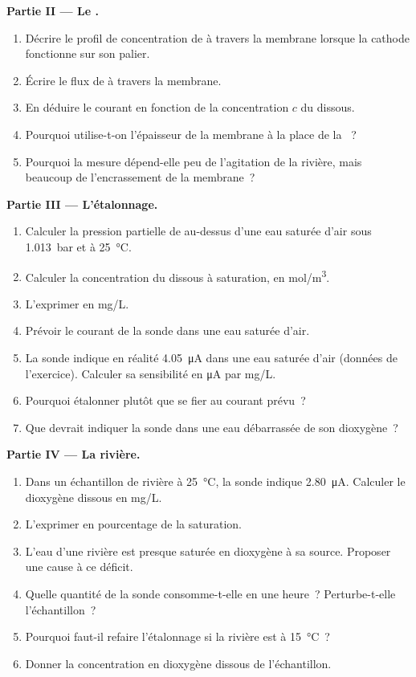 \begin{problem}
\medskip
\noindent\textbf{Partie II --- Le .}
\begin{enumerate}[resume]
  \item Décrire le profil de concentration de  à travers la membrane lorsque la
        cathode fonctionne sur son palier.
  \item Écrire le flux de  à travers la membrane.
  \item En déduire le courant en fonction de la concentration $c$ du 
        dissous.
  \item Pourquoi utilise-t-on l'épaisseur de la membrane à la place de la ~?
  \item Pourquoi la mesure dépend-elle peu de l'agitation de la rivière, mais
        beaucoup de l'encrassement de la membrane~?
\end{enumerate}

\medskip
\noindent\textbf{Partie III --- L'étalonnage.}
\begin{enumerate}[resume]
  \item Calculer la pression partielle de  au-dessus d'une eau saturée d'air sous
        \qty{1.013}{bar} et à \qty{25}{\degreeCelsius}.
  \item Calculer la concentration du  dissous à saturation, en
        \unit{mol/m^3}.
  \item L'exprimer en \unit{mg/L}.
  \item Prévoir le courant de la sonde dans une eau saturée d'air.
  \item La sonde indique en réalité \qty{4.05}{\micro A} dans une eau saturée d'air
        (données de l'exercice). Calculer sa sensibilité en \unit{\micro A} par
        \unit{mg/L}.
  \item Pourquoi étalonner plutôt que se fier au courant prévu~?
  \item Que devrait indiquer la sonde dans une eau débarrassée de son dioxygène~?
\end{enumerate}

\medskip
\noindent\textbf{Partie IV --- La rivière.}
\begin{enumerate}[resume]
  \item Dans un échantillon de rivière à \qty{25}{\degreeCelsius}, la sonde indique
        \qty{2.80}{\micro A}. Calculer le dioxygène dissous en \unit{mg/L}.
  \item L'exprimer en pourcentage de la saturation.
  \item L'eau d'une rivière est presque saturée en dioxygène à sa source.
        Proposer une cause à ce déficit.
  \item Quelle quantité de  la sonde consomme-t-elle en une heure~? Perturbe-t-elle
        l'échantillon~?
  \item Pourquoi faut-il refaire l'étalonnage si la rivière est à
        \qty{15}{\degreeCelsius}~?
  \item Donner la concentration en dioxygène dissous de l'échantillon.
\end{enumerate}
\end{problem}
